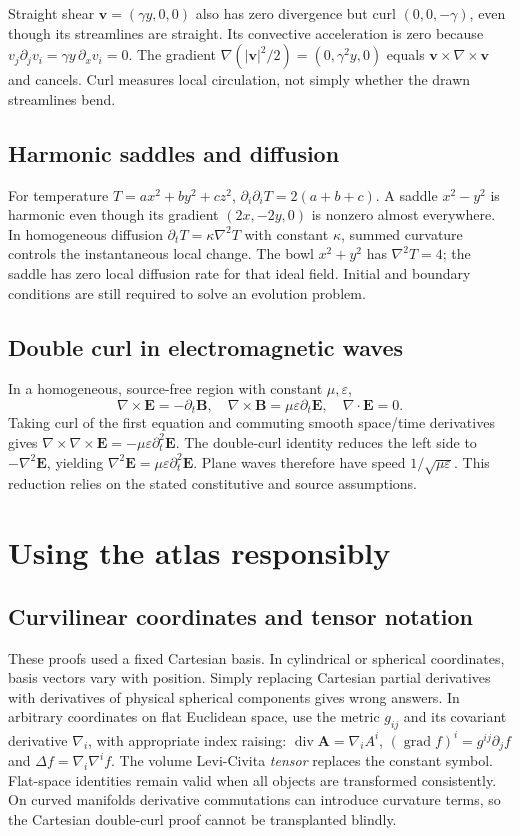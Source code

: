\documentclass[11pt]{article}
\newcommand{\A}{\mathbf A}\newcommand{\B}{\mathbf B}\newcommand{\C}{\mathbf C}\newcommand{\F}{\mathbf F}\newcommand{\xx}{\mathbf x}\newcommand{\nn}{\mathbf n}\newcommand{\grad}{\nabla}\newcommand{\divg}{\nabla\!\cdot}\newcommand{\curl}{\nabla\!\times}\newcommand{\lap}{\nabla^2}\newcommand{\eps}{\varepsilon}
\newcounter{identity}\newcommand{\identity}[2]{\refstepcounter{identity}\subsection*{\textcolor{forest}{\theidentity. #1}}\addcontentsline{toc}{subsection}{\theidentity. #1}\[ #2 \]}
\begin{document}
Straight shear $\mathbf v=(\gamma y,0,0)$ also has zero divergence but curl $(0,0,-\gamma)$, even though its streamlines are straight. Its convective acceleration is zero because $v_j\partial_jv_i=\gamma y\,\partial_xv_i=0$. The gradient $\grad(|\mathbf v|^2/2)=(0,\gamma^2y,0)$ equals $\mathbf v\times\curl\mathbf v$ and cancels. Curl measures local circulation, not simply whether the drawn streamlines bend.

\subsection{Harmonic saddles and diffusion}
For temperature $T=a x^2+b y^2+c z^2$, $\partial_i\partial_iT=2(a+b+c)$. A saddle $x^2-y^2$ is harmonic even though its gradient $(2x,-2y,0)$ is nonzero almost everywhere. In homogeneous diffusion $\partial_tT=\kappa\lap T$ with constant $\kappa$, summed curvature controls the instantaneous local change. The bowl $x^2+y^2$ has $\lap T=4$; the saddle has zero local diffusion rate for that ideal field. Initial and boundary conditions are still required to solve an evolution problem.

\subsection{Double curl in electromagnetic waves}
In a homogeneous, source-free region with constant $\mu,\eps$,
\[\curl\mathbf E=-\partial_t\mathbf B,\quad\curl\mathbf B=\mu\eps\partial_t\mathbf E,\quad\divg\mathbf E=0.\]
Taking curl of the first equation and commuting smooth space/time derivatives gives $\curl\curl\mathbf E=-\mu\eps\partial_t^2\mathbf E$. The double-curl identity reduces the left side to $-\lap\mathbf E$, yielding $\lap\mathbf E=\mu\eps\partial_t^2\mathbf E$. Plane waves therefore have speed $1/\sqrt{\mu\eps}$. This reduction relies on the stated constitutive and source assumptions.
\section{Using the atlas responsibly}
\subsection{Curvilinear coordinates and tensor notation}
These proofs used a fixed Cartesian basis. In cylindrical or spherical coordinates, basis vectors vary with position. Simply replacing Cartesian partial derivatives with derivatives of physical spherical components gives wrong answers. In arbitrary coordinates on flat Euclidean space, use the metric $g_{ij}$ and its covariant derivative $\nabla_i$, with appropriate index raising: $\operatorname{div}\A=\nabla_iA^i$, $(\operatorname{grad}f)^i=g^{ij}\partial_j f$ and $\Delta f=\nabla_i\nabla^i f$. The volume Levi-Civita \emph{tensor} replaces the constant symbol. Flat-space identities remain valid when all objects are transformed consistently. On curved manifolds derivative commutations can introduce curvature terms, so the Cartesian double-curl proof cannot be transplanted blindly.
\end{document}
